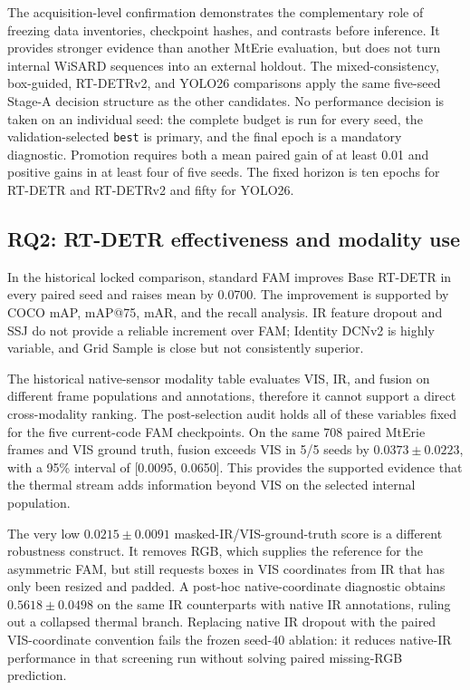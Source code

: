 The acquisition-level confirmation demonstrates the complementary role
of freezing data inventories, checkpoint hashes, and contrasts before
inference. It provides stronger evidence than another MtErie evaluation, but
does not turn internal WiSARD sequences into an external holdout. The
mixed-consistency, box-guided, RT-DETRv2, and YOLO26 comparisons apply the same
five-seed Stage-A decision structure as the other candidates. No performance
decision is taken on an individual seed: the complete budget is run for every
seed, the validation-selected \texttt{best} is primary, and the final epoch is
a mandatory diagnostic. Promotion requires both a mean paired gain of at least
0.01 and positive gains in at least four of five seeds. The fixed horizon is
ten epochs for RT-DETR and RT-DETRv2 and fifty for YOLO26.

\subsection{RQ2: RT-DETR effectiveness and modality use}

In the historical locked comparison, standard FAM improves Base RT-DETR in
every paired seed and raises mean \mapfifty{} by 0.0700. The
improvement is supported by COCO mAP, mAP@75, mAR, and the recall analysis. IR
feature dropout and SSJ do not provide a reliable increment over FAM; Identity
DCNv2 is highly variable, and Grid Sample is close but not consistently
superior.

The historical native-sensor modality table evaluates VIS, IR, and fusion on
different frame populations and annotations, therefore it cannot support a
direct cross-modality ranking. The post-selection audit holds all of these
variables fixed for the five current-code FAM checkpoints. On the same 708
paired MtErie frames and VIS ground truth, fusion exceeds VIS in 5/5 seeds
by \(0.0373\pm0.0223\), with a 95\% interval of [0.0095, 0.0650]. This provides
the supported evidence that the thermal stream adds information beyond VIS
on the selected internal population.

The very low \(0.0215\pm0.0091\) masked-IR/VIS-ground-truth score is a
different robustness construct. It removes RGB, which supplies the reference
for the asymmetric FAM, but still requests boxes in VIS coordinates from IR
that has only been resized and padded. A post-hoc native-coordinate diagnostic
obtains \(0.5618\pm0.0498\) on the same IR counterparts with native IR
annotations, ruling out a collapsed thermal branch. Replacing native IR dropout
with the paired VIS-coordinate convention fails the frozen seed-40 ablation: it
reduces native-IR performance in that screening run without solving
paired missing-RGB prediction.

